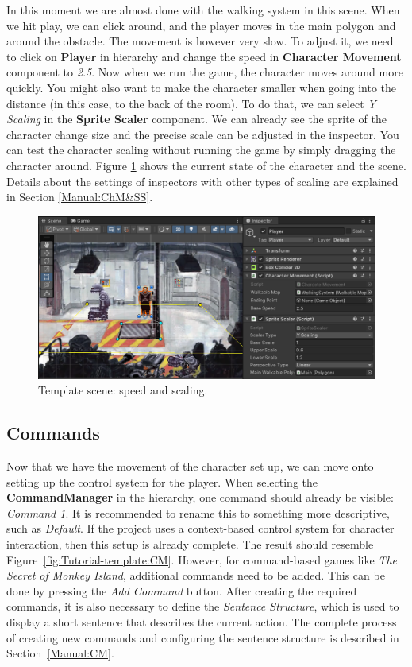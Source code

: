 In this moment we are almost done with the walking system in this scene. When we hit play, we can click around, and the player moves in the main polygon and around the obstacle. The movement is however very slow. To adjust it, we need to click on \textbf{Player} in hierarchy and change the speed in \textbf{Character Movement} component to \textit{2.5}. Now when we run the game, the character moves around more quickly. You might also want to make the character smaller when going into the distance (in this case, to the back of the room). To do that, we can select \textit{Y Scaling} in the \textbf{Sprite Scaler} component. We can already see the sprite of the character change size and the precise scale can be adjusted in the inspector. You can test the character scaling without running the game by simply dragging the character around. Figure \ref{fig:Tutorial-template:Speed&Scaling} shows the current state of the character and the scene. Details about the settings of inspectors with other types of scaling are explained in Section \ref{Manual:ChM&SS}.

\begin{figure}[H]
\centering
\includegraphics[width=1\linewidth]{img/User doc/image_2025-07-08_111936005.png}
\caption{Template scene: speed and scaling.}
\label{fig:Tutorial-template:Speed&Scaling}
\end{figure}

\subsection{Commands}
Now that we have the movement of the character set up, we can move onto setting up the control system for the player. When selecting the \textbf{CommandManager} in the hierarchy, one command should already be visible: \textit{Command 1}. It is recommended to rename this to something more descriptive, such as \textit{Default}. If the project uses a context-based control system for character interaction, then this setup is already complete. The result should resemble Figure~\ref{fig:Tutorial-template:CM}. However, for command-based games like \textit{The Secret of Monkey Island}, additional commands need to be added. This can be done by pressing the \textit{Add Command} button. After creating the required commands, it is also necessary to define the \textit{Sentence Structure}, which is used to display a short sentence that describes the current action. The complete process of creating new commands and configuring the sentence structure is described in Section~\ref{Manual:CM}.

